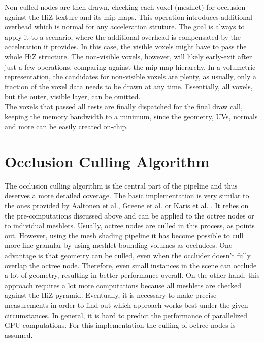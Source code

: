 Non-culled nodes are then drawn, checking each voxel (meshlet) for occlusion against the \ac{HiZ}-texture and its mip maps. 
This operation introduces additional overhead which is normal for any acceleration struture. The goal is always to apply it 
to a scenario, where the additional overhead is compensated by the acceleration it provides. In this case, the visible voxels 
might have to pass the whole \ac{HiZ} structure. The non-visible voxels, however, will likely early-exit after just a few 
operations, comparing against the mip map hierarchy. In a volumetric representation, the candidates for non-visible voxels 
are plenty, as usually, only a fraction of the voxel data needs to be drawn at any time. Essentially, all voxels, but the 
outer, visible layer, can be omitted.\\

\noindent
The voxels that passed all tests are finally dispatched for the final draw call, keeping the memory bandwidth to a minimum, 
since the geometry, UVs, normals and more can be easily created on-chip. \\


\section{Occlusion Culling Algorithm} \label{sec-occlusion}

The occlusion culling algorithm is the central part of the pipeline and thus deserves a more detailed coverage. The 
basic implementation is very similar to the ones provided by Aaltonen et al., Greene et al. or Karis et al. 
\cite{Aaltonen2015,Greene93,Karis2021}. It relies on the pre-computations discussed above and can be applied to the 
octree nodes or to individual meshlets. Usually, octree nodes are culled in this process, as \cite{AkenineMoeller2018}
points out. However, using the mesh shading pipeline it has become possible to cull more fine granular by using 
meshlet bounding volumes as occludees. One advantage is that geometry can be culled, even when the occluder doesn't 
fully overlap the octree node. Therefore, even small instances in the scene can occlude a lot of geometry, resulting 
in better performance overall. On the other hand, this approach requires a lot more computations because all meshlets 
are checked against the \ac{HiZ}-pyramid. Eventually, it is necessary to make precise measurements in order to find out 
which approach works best under the given circumstances. In general, it is hard to predict the performance of 
parallelized \ac{GPU} computations. For this implementation the culling of octree nodes is assumed. 

